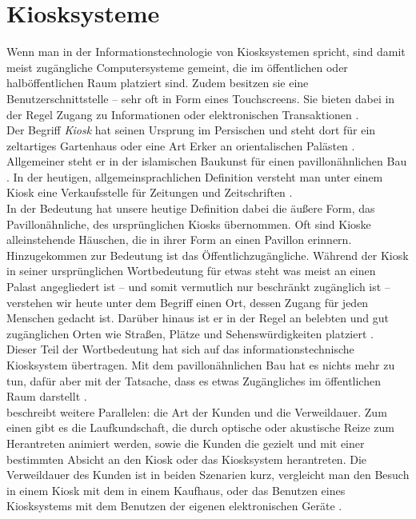 \section{Kiosksysteme}
\label{sec:kiosk}

Wenn man in der Informationstechnologie von Kiosksystemen spricht,
sind damit meist zugängliche Computersysteme gemeint, die im öffentlichen oder halböffentlichen 
Raum platziert sind. Zudem besitzen sie eine Benutzerschnittstelle -- sehr oft in Form
eines Touchscreens. Sie bieten dabei in der Regel Zugang zu Informationen 
oder elektronischen Transaktionen \cite{retailing}.\\

Der Begriff \emph{Kiosk} hat seinen Ursprung im Persischen und steht dort für
ein zeltartiges Gartenhaus oder eine Art Erker an orientalischen Palästen \cite{meyers}.
Allgemeiner steht er in der islamischen Baukunst für einen pavillonähnlichen Bau \cite{taschenlexikon}.
In der heutigen, allgemeinsprachlichen Definition versteht man unter einem Kiosk eine Verkaufsstelle
für Zeitungen und Zeitschriften \cite{taschenlexikon, meyers}.\\
In der Bedeutung hat unsere heutige Definition dabei die äußere Form, das Pavillonähnliche, 
des ursprünglichen Kiosks übernommen. Oft sind Kioske alleinstehende Häuschen, die in ihrer Form
an einen Pavillon erinnern. Hinzugekommen zur Bedeutung ist das Öffentlichzugängliche. Während der Kiosk 
in seiner ursprünglichen Wortbedeutung für etwas steht was meist an einen Palast angegliedert ist -- und 
somit vermutlich nur beschränkt zugänglich ist -- verstehen wir heute unter dem Begriff einen Ort, dessen Zugang
für jeden Menschen gedacht ist. Darüber hinaus ist er in der Regel an belebten und gut zugänglichen Orten 
wie Straßen, Plätze und Sehenswürdigkeiten platziert \cite{multimediale}.\\
Dieser Teil der Wortbedeutung hat sich auf das informationstechnische Kiosksystem übertragen. Mit dem 
pavillonähnlichen Bau hat es nichts mehr zu tun, dafür aber mit der Tatsache, dass es etwas Zugängliches 
im öffentlichen Raum darstellt \cite{multimediale}.\\
 beschreibt weitere Parallelen: die Art der Kunden und 
die Verweildauer. Zum einen gibt es die Laufkundschaft, die durch optische oder akustische Reize
zum Herantreten animiert werden, sowie die Kunden die gezielt und mit einer bestimmten Absicht an den Kiosk
oder das Kiosksystem herantreten. Die Verweildauer des Kunden ist in beiden Szenarien kurz, 
vergleicht man den Besuch in einem Kiosk mit dem in einem Kaufhaus, oder das Benutzen eines Kiosksystems
mit dem Benutzen der eigenen elektronischen Geräte \cite{multimediale}.\\

